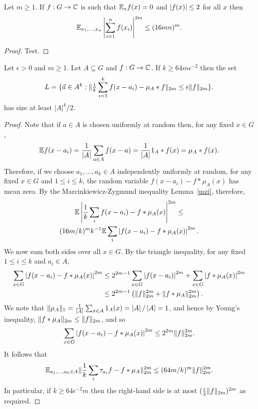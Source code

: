 \begin{lemma}
\label{mzi-complex}
\leanok
{}
Let $m\geq 1$. If $f:G\to\mathbb{C}$ is such that $\mathbb{E}_x f(x)=0$ and $\left\lvert f(x)\right\rvert\leq 2$ for all $x$ then
\[\mathbb{E}_{x_1,\ldots,x_n} \left\lvert \sum_{i=1}^n f(x_i)\right\rvert^{2m} \leq (16mn)^{m}.\]
\end{lemma}

\begin{proof}
\leanok
Test.
\end{proof}


\begin{lemma}
\label{random_approx_expect}
\leanok
Let $\epsilon>0$ and $m\geq 1$. Let $A\subseteq G$ and $f:G\to \mathbb{C}$. If $k\geq 64m\epsilon^{-2}$ then the set
\[L=\{ {\vec{a}}\in A^k : \|\tfrac{1}{k}\sum_{i=1}^kf(x-a_i)-\mu_A\ast f\|_{2m}\leq \epsilon \| f\|_{2m}\}.\]
has size at least $\lvert A \rvert^k/2$.
\end{lemma}

\begin{proof}
\leanok
Note that if $a\in A$ is chosen uniformly at random then, for any fixed $x\in G$,
\[\mathbb{E} f(x-a_i)= \frac{1}{\left\lvert A\right\rvert}\sum_{a\in A}f(x-a)=\frac{1}{\left\lvert A\right\rvert}1_{A}\ast f(x)=\mu_A\ast f(x).\]
Therefore, if we choose $a_1,\ldots,a_k\in A$ independently uniformly at random, for any fixed $x\in G$ and $1\leq i\leq k$,  the random variable $f(x-a_i)-f\ast \mu_A(x)$ has mean zero. By the Marcinkiewicz-Zygmund inequality Lemma~\ref{mzi}, therefore,
\begin{multline*}
\mathbb{E}\left\lvert  \frac{1}{k}\sum_i f(x-a_i)-f\ast \mu_A(x)\right\rvert^{2m} \leq \\(16m/k)^mk^{-1} \mathbb{E} \sum_i \left\lvert f(x-a_i)-f\ast \mu_A(x)\right\rvert^{2m}.
\end{multline*}
We now sum both sides over all $x\in G$. By the triangle inequality, for any fixed $1\leq i\leq k$ and $a_i\in A$,
\begin{align*}
\sum_{x\in G} \left\lvert f(x-a_i)-f\ast \mu_A(x)\right\rvert^{2m}
&\leq 2^{2m-1}\sum_{x\in G}\left\lvert f(x-a_i)\right\rvert^{2m}+\sum_{x\in G}\left\lvert f\ast \mu_A(x)\right\rvert^{2m}\\
&\leq 2^{2m-1}\left( \lVert f\rVert_{2m}^{2m}+\lVert f\ast \mu_A\rVert_{2m}^{2m}\right).
\end{align*}
We note that $\lVert \mu_A\rVert_1=\frac{1}{\left\lvert A\right\rvert}\sum_{x\in A}1_{A}(x)=\left\lvert A\right\rvert/\left\lvert A\right\rvert=1$, and hence by Young's inequality, $\lVert f\ast \mu_A\rVert_{2m}\leq \lVert f\rVert_{2m}$, and so
\[\sum_{x\in G} \left\lvert f(x-a_i)-f\ast \mu_A(x)\right\rvert^{2m}\leq 2^{2m}\lVert f\rVert_{2m}^{2m}.\]
It follows that
\[\mathbb{E}_{a_1,\ldots,a_k\in A}\lVert \frac{1}{k}\sum_i\tau_{a_i}f-f\ast \mu_A\rVert_{2m}^{2m}\leq
(64m/k)^m\lVert f\rVert_{2m}^{2m}.\]
In particular, if $k\geq 64\epsilon^{-2}m$ then the right-hand side is at most $(\frac{\epsilon}{2}\lVert f\rVert_{2m})^{2m}$ as required.
\end{proof}


